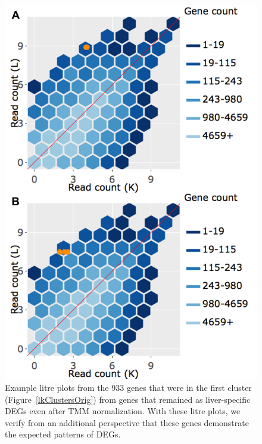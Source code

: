\documentclass[11pt,a4paper,oldfontcommands,openany]{memoir}
\numberwithin{equation}{section} %
\begin{document}
\null
\begin{figure}[t!]
\begin{framed}
\centerline{\includegraphics[width=0.7\columnwidth]{MakeFigures/Dashboards/litreClusterOrig/litreClusterOrig.jpg}}
\end{framed}
\caption{Example litre plots from the 933 genes that were in the first cluster (Figure~\ref{lkClustersOrig}) from genes that remained as liver-specific DEGs even after TMM normalization. With these litre plots, we verify from an additional perspective that these genes demonstrate the expected patterns of DEGs.
\label{litreClusterOrig}}
\end{figure}
\end{document}
